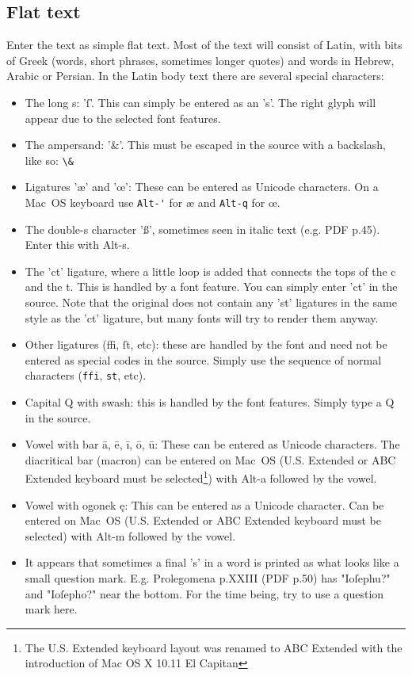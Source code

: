\documentclass{report}
\begin{document}
\subsection{Flat text}
Enter the text as simple flat text.
Most of the text will consist of Latin,
with bits of Greek (words, short phrases, sometimes longer quotes) and words
in Hebrew, Arabic or Persian.
In the Latin body text there are several special characters:
\begin{itemize}
\item The long s: 'ſ'. This can simply be entered as an 's'. The right glyph
will appear due to the selected font features.
\item The ampersand: '\&'. This must be escaped in the source with a backslash,
like so: \verb;\&;
\item Ligatures 'æ' and 'œ': These can be entered as Unicode characters.
On a Mac~OS keyboard use \verb;Alt-'; for æ and \verb;Alt-q; for œ.
\item The double-s character 'ß', sometimes seen in italic text (e.g. PDF p.45).
Enter this with Alt-s.
\item The 'ct' ligature, where a little loop is added that connects the tops
of the c and the t.
This is handled by a font feature.
You can simply enter 'ct' in the source.
Note that the original does not contain any 'st' ligatures in the same style
as the 'ct' ligature, but many fonts will try to render them anyway.
\item Other ligatures (ffi, ſt, etc): these are handled by the font and need
not be entered as special codes in the source.
Simply use the sequence of normal characters (\verb;ffi;, \verb;st;, etc).
\item  Capital Q with swash: this is handled by the font features.
Simply type a Q in the source.
\item Vowel with bar ā, ē, ī, ō, ū: These can be entered as Unicode characters.
The diacritical bar (macron) can be entered on Mac~OS (U.S. Extended or
ABC Extended keyboard must be
selected\footnote{The U.S. Extended keyboard layout was renamed to
ABC Extended with the introduction of Mac OS X 10.11 El Capitan})
with Alt-a followed by the vowel.
\item Vowel with ogonek ę: This can be entered as a Unicode character.
Can be entered on Mac~OS (U.S. Extended or ABC Extended keyboard must be
selected\footnotemark[\value{footnote}]) with Alt-m followed by the vowel.
\item It appears that sometimes a final 's' in a word is printed as what looks like a small question mark. E.g. Prolegomena p.XXIII (PDF p.50) has "Ioſephu?" and "Ioſepho?" near the bottom. For the time being, try to use a question mark here.
\end{itemize}
\end{document}
